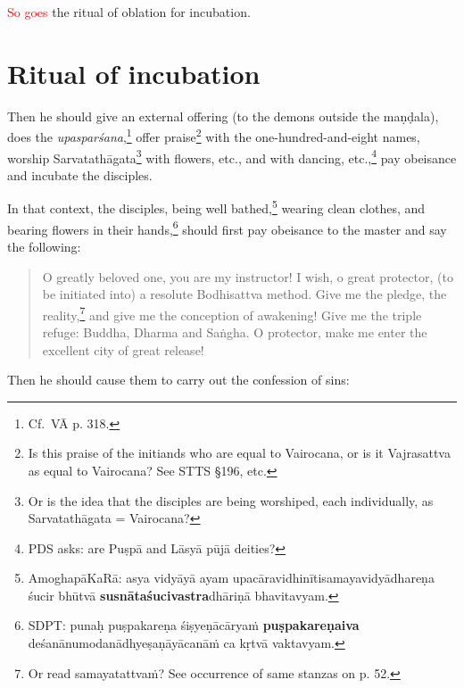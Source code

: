 \documentclass[11pt]{book}
\newcommand{\red}[1]{\textcolor{red}{#1}}
\newcommand{\skt}[1]{\emph{#1}}
\begin{document}
\red{So goes} the ritual of oblation for incubation.

\section{Ritual of incubation}
Then he should give an external offering (to the demons outside the maṇḍala), does the \skt{upasparśana},\footnote{Cf.~VĀ p. 318.} offer praise\footnote{Is this praise of the initiands who are equal to Vairocana, or is it Vajrasattva as equal to Vairocana? See STTS §196, etc.} with the one-hundred-and-eight names,  worship Sarvatathāgata\footnote{Or is the idea that the disciples are being worshiped, each individually, as Sarvatathāgata = Vairocana?} with flowers, etc., and with dancing, etc.,\footnote{PDS asks: are Puṣpā and Lāsyā pūjā deities?} pay obeisance and incubate the disciples.

In that context, the disciples, being well bathed,\footnote{AmoghapāKaRā: asya vidyāyā ayam upacāravidhinītisamayavidyādhareṇa śucir bhūtvā \textbf{susnātaśucivastra}dhāriṇā bhavitavyam.} wearing clean clothes, and bearing flowers in their hands,\footnote{SDPT: punaḥ puṣpakareṇa śiṣyeṇācāryaṁ \textbf{puṣpakareṇaiva} deśanānumodanādhyeṣaṇāyācanāṁ ca kṛtvā vaktavyam.} should first pay obeisance to the master and say the following:

\begin{verse}
O greatly beloved one, you are my instructor! I wish, o great protector, (to be initiated into) a resolute Bodhisattva method. Give me the pledge, the reality,\footnote{Or read samayatattvaṁ? See occurrence of same stanzas on p. 52.} and give me the conception of awakening! Give me the triple refuge: Buddha, Dharma and Saṅgha. O protector, make me enter the excellent city of great release!
\end{verse}

Then he should cause them to carry out the confession of sins:

\end{document}
